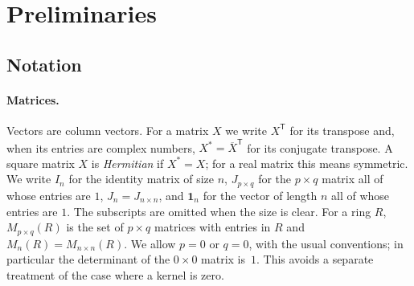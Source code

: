 \documentclass[11pt,a4paper]{article}
\theoremstyle{remark}
\newcommand{\one}{\mathbf{1}}
\newcommand{\tp}{\mathsf{T}}
\begin{document}
\section{Preliminaries}\label{sec:prelim}

\subsection{Notation}
\paragraph{Matrices.} Vectors are column vectors. For a matrix $X$ we write $X^{\tp}$ for its transpose and, when
its entries are complex numbers, $X^*=\overline{X}^{\tp}$ for its conjugate transpose. A square matrix $X$ is
\emph{Hermitian} if $X^*=X$; for a real matrix this means symmetric. We write $I_n$ for the identity matrix of size
$n$, $J_{p\times q}$ for the $p\times q$ matrix all of whose entries are $1$, $J_n=J_{n\times n}$, and $\one_n$ for the
vector of length $n$ all of whose entries are $1$. The subscripts are omitted when the size is clear. For a ring $R$,
$M_{p\times q}(R)$ is the set of $p\times q$ matrices with entries in $R$ and $M_n(R)=M_{n\times n}(R)$. We allow
$p=0$ or $q=0$, with the usual conventions; in particular the determinant of the $0\times0$ matrix is~$1$. This
avoids a separate treatment of the case where a kernel is zero.
\end{document}
